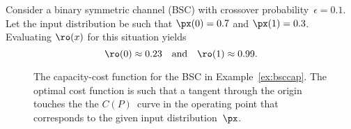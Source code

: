 \begin{example}
  \label{ex:bsccap}
  Consider a binary symmetric channel (BSC) with crossover
  probability~$\epsilon=0.1$. Let the input distribution be such that $\px(0) =
  0.7$ and $\px(1) = 0.3$. Evaluating $\ro(x)$ for this situation yields
  \begin{equation*}
    \ro(0) \approx 0.23 \quad\text{and} \quad
    \ro(1) \approx 0.99.
  \end{equation*}
\end{example}
\medbreak
\begin{figure}
  \begin{center}
  \end{center}
  \caption{The capacity-cost function for the BSC in Example~\ref{ex:bsccap}.
  The optimal cost function is such that a tangent through the origin touches
  the the $C(P)$~curve in the operating point that corresponds to the given
  input distribution~$\px$.}
  \label{fig:bsccap}
\end{figure}

